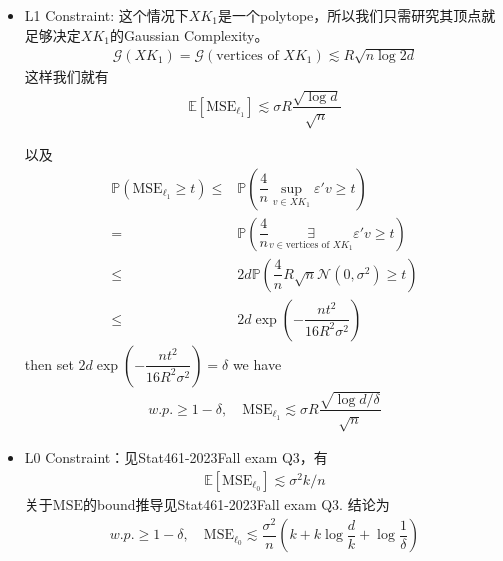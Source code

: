 \documentclass[11pt,a4paper]{ctexart}
\numberwithin{equation}{section}%
\begin{document}
\begin{itemize}[topsep=2pt,itemsep=0pt]
    \item L1 Constraint: 这个情况下$ XK_1 $是一个polytope，所以我们只需研究其顶点就足够决定$ XK_1 $的Gaussian Complexity。
    \begin{align*}
         \mathcal{G}(XK_1) = \mathcal{G}(\text{vertices of }XK_1) \lesssim  R\sqrt{n\log 2d}
    \end{align*}
    这样我们就有
    \begin{align*}
        \mathbb{E}\left[ \mathrm{ MSE }_{\ell_1}  \right] \lesssim \sigma R \dfrac{ \sqrt{\log d} }{ \sqrt{n} } 
    \end{align*}

    以及
    \begin{align*}
        \mathbb{P}\left( \mathrm{ MSE }_{\ell_1} \geq t \right) \leq & \mathbb{P}\left( \dfrac{ 4 }{ n } \mathop{ \sup  }\limits_{v\in XK_1 }  \varepsilon 'v \geq t  \right) \\
        =& \mathbb{P}\left( \dfrac{ 4 }{ n } \mathop{ \exists  }\limits_{v\in \text{vertices of } XK_1 }  \varepsilon 'v \geq t  \right) \\
        \leq & 2d \mathbb{P}\left( \dfrac{ 4 }{ n } R\sqrt{n}\mathcal{N}(0,\sigma ^2) \geq t \right) \\
        \leq & 2d \exp\left( -\dfrac{ n t^2 }{ 16R^2\sigma ^2 }  \right)
    \end{align*}
    then set $ 2d\exp\left( -\dfrac{ n t^2 }{ 16R^2\sigma ^2 }\right) = \delta $ we have
    \begin{align*}
        w.p. \geq 1-\delta ,\quad \mathrm{ MSE }_{\ell_1} \lesssim \sigma R\dfrac{ \sqrt{\log d/\delta } }{ \sqrt{n} } 
    \end{align*}
    
    \item L0 Constraint：见Stat461-2023Fall exam Q3，有
    \begin{align*}
        \mathbb{E}\left[ \mathrm{ MSE }_{\ell_0}  \right] \lesssim \sigma ^2k/n
    \end{align*}
    关于$ \mathrm{ MSE }  $的bound推导见Stat461-2023Fall exam Q3. 结论为
    \begin{align*}
        w.p. \geq 1-\delta ,\quad \mathrm{ MSE }_{\ell_0} \lesssim \dfrac{ \sigma ^2 }{ n }\left( k + k\log\dfrac{ d }{ k } + \log \dfrac{ 1 }{ \delta  }   \right) 
    \end{align*}
    
\end{itemize}
\end{document}
